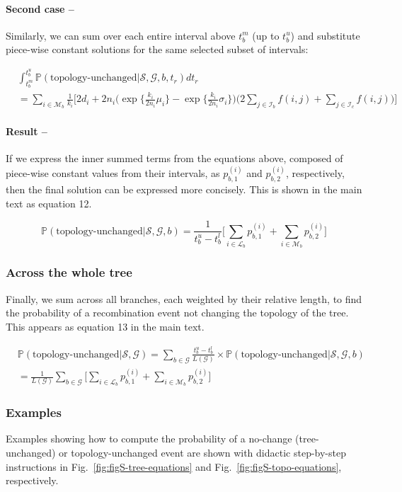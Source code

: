 \documentclass[11pt]{article}
\begin{document}
\paragraph{Second case --}
Similarly, we can sum over each entire interval above $t_b^m$ (up to $t_b^u$) and substitute piece-wise
constant solutions for the same selected subset of intervals:

\begin{equation}
\begin{aligned}
	&\int_{t_b^m}^{t_b^u} \mathbb{P} (\textrm{topology-unchanged} | \mathcal{S}, \mathcal{G}, b, t_r) dt_r \\
	&= \sum_{i \in \mathcal{M}_b} \frac{1}{k_i} \Bigg[ 
		2d_i + 2n_i \bigg( 
			\exp \bigg\{ \frac{k_i}{2n_i} \mu_i \bigg\} - 
			\exp \bigg\{ \frac{k_i}{2n_i} \sigma_i \bigg\}
		\bigg) 
		\bigg(2 \sum_{j \in \mathcal{I}_b} f(i,j) + \sum_{j \in \mathcal{I}_c} f(i,j) \bigg)
	\Bigg]
\end{aligned}
\end{equation}

\paragraph{Result --}
If we express the inner summed terms from the equations above, composed of piece-wise
constant values from their intervals, as $p_{b,1}^{(i)}$ and $p_{b,2}^{(i)}$, 
respectively, then the final solution can be expressed more concisely. 
This is shown in the main text as equation 12.

\begin{equation}\tag{12}
     \mathbb{P}(\text{topology-unchanged} | \mathcal{S}, \mathcal{G}, b) = 
     \frac{1}{t_b^u - t_b^l} 
     \bigg[ 
	    \sum_{i \in \mathcal{L}_b} p_{b,1}^{(i)} + 
	    \sum_{i \in \mathcal{M}_b} p_{b,2}^{(i)}
	\bigg]
\end{equation}


\subsubsection{Across the whole tree}

Finally, we sum across all branches, each weighted by their relative length, 
to find the probability of a recombination event not changing the 
topology of the tree. This appears as equation 13 in the main text.

\begin{equation}\tag{13}
\begin{aligned}
    &\mathbb{P}(\text{topology-unchanged}| \mathcal{S}, \mathcal{G}) = 
    \sum_{b \in \mathcal{G}}
    \frac{t_b^u - t_b^l}
    {L(\mathcal{G})} \times \mathbb{P}(\text{topology-unchanged}| \mathcal{S}, \mathcal{G}, b) \\
    & = \frac{1}{L(\mathcal{G})} \sum_{b \in \mathcal{G}}
     \bigg[ 
	    \sum_{i \in \mathcal{L}_b} p_{b,1}^{(i)} + 
	    \sum_{i \in \mathcal{M}_b} p_{b,2}^{(i)}
	\bigg]
\end{aligned}
\end{equation}


\subsubsection{Examples}
Examples showing how to compute the probability of a no-change 
(tree-unchanged) or topology-unchanged event are shown with didactic
step-by-step instructions in 
Fig.~\ref{fig:figS-tree-equations} and
Fig.~\ref{fig:figS-topo-equations}, 
respectively.
\end{document}
